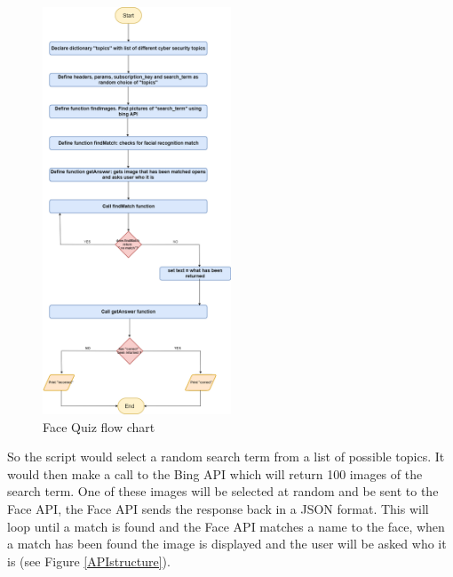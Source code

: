 \documentclass[12pt,a4paper]{article}
\begin{document}
\begin{figure}[!ht]
    \centering
    \includegraphics[width=0.50\textwidth]{Figs/Face_Quiz (1).png}
    \caption{Face Quiz flow chart} 
    \label{FaceQuiz}
\end{figure}     

So the script would select a random search term from a list of possible topics. It would then make a call to the Bing API which will return 100 images of the search term. One of these images will be selected at random and be sent to the Face API, the Face API sends the response back in a JSON format. This will loop until a match is found and the Face API matches a name to the face, when a match has been found the image is displayed and the user will be asked who it is (see Figure \ref{APIstructure}).  
\end{document}
